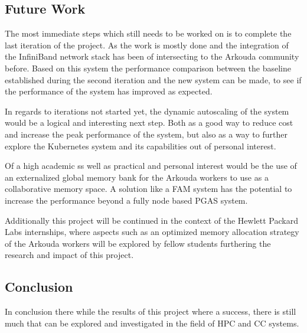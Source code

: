 \subsection{Future Work}
\label{sec:future_work}

The most immediate steps which still needs to be worked on is to complete the last iteration of the project.
As the work is mostly done and the integration of the InfiniBand network stack has been of intersecting to
the Arkouda community before.
Based on this system the performance comparison between the baseline established during the second iteration
and the new system can be made, to see if the performance of the system has improved as expected.

In regards to iterations not started yet, the dynamic autoscaling of the system would be a logical and
interesting next step. Both as a good way to reduce cost and increase the peak performance of the system,
but also as a way to further explore the Kubernetes system and its capabilities out of personal interest.

Of a high academic ss well as practical and personal interest would be the use of an
externalized global memory bank for the Arkouda workers to use as a collaborative memory space.
A solution like a \ac{FAM} system has the potential to increase the performance beyond a fully
node based \ac{PGAS} system.

Additionally this project will be continued in the context of the Hewlett Packard Labs internships,
where aspects such as an optimized memory allocation strategy of the Arkouda workers will be explored
by fellow students furthering the research and impact of this project.

\subsection{Conclusion}

In conclusion there while the results of this project where a success,
there is still much that can be explored and investigated in the field of \ac{HPC} and \ac{CC} systems.

